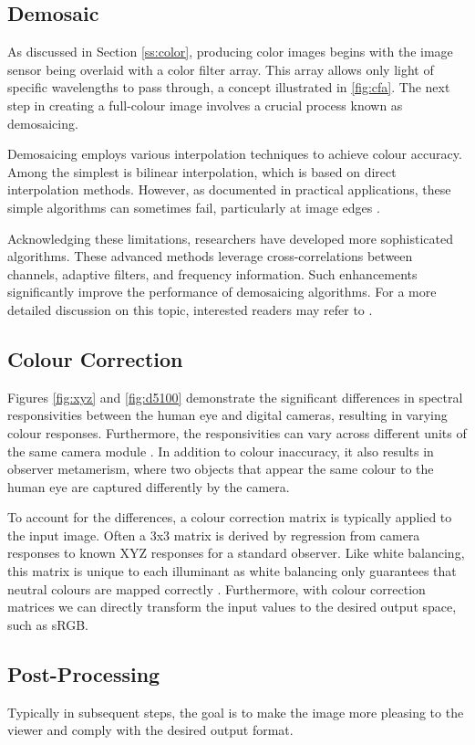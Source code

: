 \subsection{Demosaic}

As discussed in Section \ref{ss:color}, producing color images begins with the image sensor being overlaid with a color filter array. This array allows only light of specific wavelengths to pass through, a concept illustrated in \ref{fig:cfa}. The next step in creating a full-colour image involves a crucial process known as demosaicing.

Demosaicing employs various interpolation techniques to achieve colour accuracy. Among the simplest is bilinear interpolation, which is based on direct interpolation methods. However, as documented in practical applications, these simple algorithms can sometimes fail, particularly at image edges \cite[46]{Ramanath}.

Acknowledging these limitations, researchers have developed more sophisticated algorithms. These advanced methods leverage cross-correlations between channels, adaptive filters, and frequency information. Such enhancements significantly improve the performance of demosaicing algorithms. For a more detailed discussion on this topic, interested readers may refer to \cite{gunturk2005demosaicking}.

\subsection{Colour Correction}

Figures \ref{fig:xyz} and \ref{fig:d5100} demonstrate the significant differences in spectral responsivities between the human eye and digital cameras, resulting in varying colour responses. Furthermore, the responsivities can vary across different units of the same camera module \cite{walowit2019best}. In addition to colour inaccuracy, it also results in observer metamerism, where two objects that appear the same colour to the human eye are captured differently by the camera.

To account for the differences, a colour correction matrix is typically applied to the input image. Often a 3x3 matrix is derived by regression from camera responses to known XYZ responses for a standard observer. \cite{rowlands2020color} Like white balancing, this matrix is unique to each illuminant as white balancing only guarantees that neutral colours are mapped correctly \cite{cheng2015beyond}. Furthermore, with colour correction matrices we can directly transform the input values to the desired output space, such as sRGB.

\subsection{Post-Processing}

Typically in subsequent steps, the goal is to make the image more pleasing to the viewer and comply with the desired output format.


